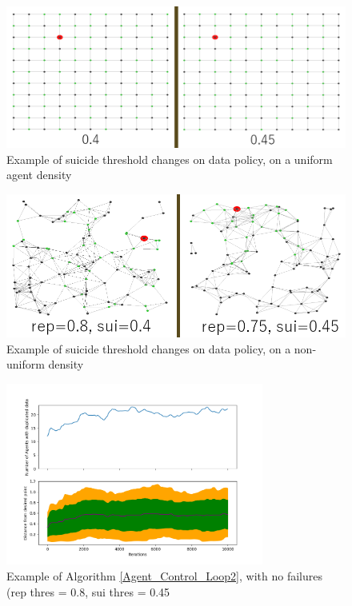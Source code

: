 \documentclass{UoYCSproject}
\begin{document}
\begin{figure}[htb]
\label{fig:Data8}
\begin{center}
\centering
\includegraphics[width=\linewidth]{"./Rep_Sui_0.8_0.4-0.45_uniform_no_mo.png"}
\caption{Example of suicide threshold changes on data policy, on a uniform agent density}
\end{center}
\end{figure}

\begin{figure}[htb]
\label{fig:Data9}
\begin{center}
\centering
\includegraphics[width=\linewidth]{"./Rep_Sui_no_uniform_no_mo.png"}
\caption{Example of suicide threshold changes on data policy, on a non-uniform density}
\end{center}
\end{figure}

\begin{figure}[htb]
\label{fig:Data10}
\begin{center}
\centering
\includegraphics[height=6cm]{"./New_Replication_Scheme_No_Death_0.8r_0.45s.png"}
\caption{Example of Algorithm \ref{Agent_Control_Loop2}, with no failures (rep thres = 0.8, sui thres = 0.45}
\end{center}
\end{figure}
\end{document}
